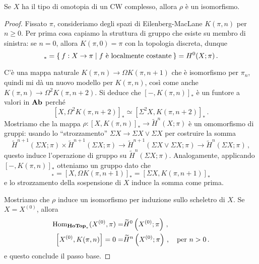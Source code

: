 	\begin{thm}\label{coh-rep}
		Se $X$ ha il tipo di omotopia di un CW complesso,
		allora $\rho$ è un isomorfismo.
		\begin{proof}
			Fissato $\pi$, consideriamo degli spazi di Eilenberg-MacLane
			$K(\pi,n)$ per $n \ge 0$. Per prima cosa capiamo
			la struttura di gruppo che esiste su membro di sinistra: %
			se $n=0$, allora $K(\pi,0)=\pi$ con la topologia discreta, dunque
			\begin{equation*}
				[X,K(\pi,0)]_{\ast} = \Set{f:X \to \pi | f \text{ è localmente costante} }
				= H^{0}(X;\pi)\,.
			\end{equation*}
			
			C'è una mappa naturale $K(\pi,n) \to \Omega K(\pi,n+1)$
			che è isomorfismo per $\pi_{n}$, quindi mi dà un nuovo modello per $K(\pi,n)$,
			così come anche $K(\pi,n) \to\Omega^{2} K(\pi, n+2)$.
			Si deduce che $[-,K(\pi,n)]_{\ast}$ è un funtore a valori in ${\normalfont\textbf{Ab}}$
			perché
			\begin{equation*}
				\left[X,\Omega^{2}K(\pi,n+2)\right]_{\ast} \simeq 
				\left[\Sigma^{2} X, K(\pi,n+2)\right]_{\ast}\,.
			\end{equation*}
			Mostriamo che la mappa $\rho: [X,K(\pi,n)]_{\ast} \to \widetilde{H}^{n}(X;\pi)$ 
			è un omomorfismo di gruppi: 
			usando lo ``strozzamento'' $\Sigma X \to \Sigma X \vee \Sigma X$
			per costruire la somma
		\begin{equation*}
			\widetilde{H}^{n+1}(\Sigma X;\pi) \times \widetilde{H}^{n+1}(\Sigma X;\pi)
			\longrightarrow \widetilde{H}^{n+1}(\Sigma X \vee \Sigma X;\pi)
			\longrightarrow \widetilde{H}^{n}(\Sigma X;\pi)\,,
		\end{equation*}
		questo induce l'operazione di gruppo su $\widetilde{H}^{n}(\Sigma X;\pi)$.
		Analogamente, applicando $[-,K(\pi,n)]_{\ast}$ otteniamo un gruppo dato che
		\begin{equation*}
			[X,K(\pi,n)]_{\ast} = [X,\Omega K(\pi,n+1)]_{\ast} = [\Sigma X,K(\pi,n+1)]_{\ast}
		\end{equation*}
		e lo strozzamento della sospensione di $X$ induce la somma come prima.
		
		Mostriamo che $\rho$ induce un isomorfismo per induzione sullo scheletro di $X$.
		Se $X=X^{(0)}$, allora
		\begin{align*}
			\operatorname{Hom}_{{\normalfont\textbf{HoTop}}_{\ast}}(X^{(0)},\pi) =& \widetilde{H}^{0}\left(X^{(0)};\pi\right)\,, \\
			\left[ X^{(0)}, K(\pi,n) \right] = 0 
			=& \widetilde{H}^{n}\left(X^{(0)};\pi\right)\,, \quad \text{per } n>0\,.
		\end{align*}
		e questo conclude il passo base. 
		

\end{proof}
\end{thm}

